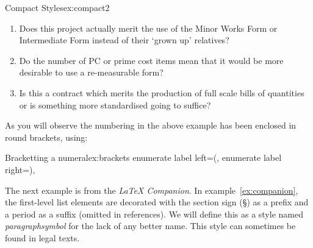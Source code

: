 \begin{texexample}{Compact Styles}{ex:compact2}
\makeatletter
{}
\makeatother


\begin{enumerate}
\item Does this project actually merit the use of the Minor Works Form or Intermediate Form instead of their `grown up' relatives?
\item Do the number of PC or prime cost items mean that it would be more desirable to use a re-measurable form?
\item Is this a contract which merits the production of full scale bills
of quantities or is something more standardised going to suffice?
\end{enumerate}
\end{texexample}



As you will observe the numbering in the above example has been enclosed in round brackets, using:


\begin{texcode}{Bracketting a numeral}{ex:brackets}
  enumerate label left=(,
  enumerate label right=),
\end{texcode}


The next example is from the \textit{LaTeX Companion}. In example~\ref{ex:companion}, the first-level list elements are decorated with the section sign (\S) as a prefix and a period as a suffix (omitted in references). We will
define this as a style named \textit{paragraphsymbol} for the lack of any better name. This style can sometimes be found in legal texts.

